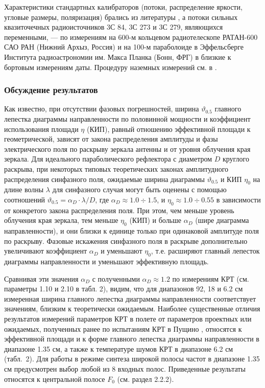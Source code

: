 Характеристики  стандартных калибраторов (потоки, распределение яркости,
угловые размеры, поляризация) брались из литературы  \cite{},
а потоки сильных квазиточечных радиоисточников 3С 84, 3С 273 и 3С 279,
являющихся переменными, --- по измерениям на 600-м кольцевом
радиотелескопе РАТАН-600 САО РАН (Нижний Архыз, Россия) и на
100-м параболоиде в Эффельсберге Института радиоастрономии
им. Макса Планка (Бонн, ФРГ) \cite{} в близкие к бортовым измерениям
даты. Процедуру наземных измерений см. в \cite{}.


\subsubsection{Обсуждение результатов}


Как известно, при отсутствии фазовых погрешностей,
ширина $\vartheta_{0.5}$ главного лепестка диаграммы
направленности по
половинной мощности и коэффициент использования площади
$\eta$ (КИП), равный отношению эффективной площади к
геометрической, зависят от закона распределения амплитуды
и фазы электрического поля по раскрыву зеркала антенны
и от уровня облучения края зеркала.
Для идеального параболического рефлектора с
диаметром $D$ круглого раскрыва, при некоторых
типовых теоретических законах амплитудного распределения
синфазного поля, ожидаемые ширина диаграммы $\vartheta_{0.5}$ и КИП $\eta_0$
на длине волны $\lambda$
для синфазного случая могут быть оценены с помощью соотношений
 \cite{}
$\vartheta_{0.5} = \alpha_D \cdot \lambda / D$,
где $\alpha_D \approx 1.0 \div 1.5$, и $\eta_0 \approx 1.0 \div 0.55$
в зависимости от конкретого закона распределения поля.
При этом, чем меньше уровень облучения края зеркала,
тем меньше $\eta_0$ (КИП) и больше $\alpha_D$ (шире диаграмма
направленности), и они близки к единице только при одинаковой
амплитуде поля по раскрыву. Фазовые искажения синфазного поля
в раскрыве дополнительно увеличивают коэффициент $\alpha_D$ и
уменьшают $\eta_0$, т.е. расширяют главный лепесток диаграммы
направленности и уменьшают эффективную площадь.

Сравнивая эти значения $\alpha_D$ с полученными
$\alpha_D \approx 1.2$ по измерениям КРТ
(см. параметры 1.10 и 2.10 в табл. 2),
видим, что для диапазонов 92, 18 и 6.2 см
измеренная ширина главного лепестка диаграммы направленности
соответствует значениям, близким к теоретически ожидаемым.
Наиболее существенные отличия результатов измерений параметров
КРТ в полете от параметров проектных или ожидаемых, полученных ранее
по испытаниям КРТ в Пущино \cite{}, относятся
к эффективной площади и к форме
главного лепестка диаграммы направленности в диапазоне 1.35 см,
а также к температуре шумов КРТ в диапазоне 6.2 см (табл.~2).
Для работы в режиме синтеза широкой полосы частот в диапазоне 1.35 см
предусмотрен выбор любой из 8 входных полос.
Приведенные результаты относятся к центральной полосе $F_0$
(см. раздел 2.2.2).

